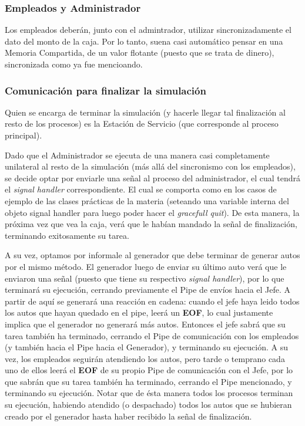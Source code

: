 \documentclass[a4paper,12pt]{article}
\begin{document}
\subsubsection{Empleados y Administrador}
Los empleados deberán, junto con el admintrador, utilizar sincronizadamente el dato del monto de la caja. Por lo tanto, suena casi automático pensar en una Memoria Compartida, de un valor flotante (puesto que se trata de dinero), sincronizada como ya fue mencioando.

\subsubsection{Comunicación para finalizar la simulación}
Quien se encarga de terminar la simulación (y hacerle llegar tal finalización al resto de los procesos) es la Estación de Servicio (que corresponde al proceso principal).

Dado que el Administrador se ejecuta de una manera casi completamente unilateral al resto de la simulación (más allá del sincronismo con los empleados), se decide optar por enviarle una señal al proceso del administrador, el cual tendrá el \textit{signal handler} correspondiente. El cual se comporta como en los casos de ejemplo de las clases prácticas de la materia (seteando una variable interna del objeto signal handler para luego poder hacer el \textit{gracefull quit}). De esta manera, la próxima vez que vea la caja, verá que le habían mandado la señal de finalización, terminando exitosamente su tarea.

A su vez, optamos por informale al generador que debe terminar de generar autos por el mismo método. El generador luego de enviar su último auto verá que le enviaron una señal (puesto que tiene su respectivo \textit{signal handler}), por lo que terminará su ejecución, cerrando previamente el Pipe de envíos hacia el Jefe. A partir de aquí se generará una reacción en cadena: cuando el jefe haya leido todos los autos que hayan quedado en el pipe, leerá un \textbf{EOF}, lo cual justamente implica que el generador no generará más autos. Entonces el jefe sabrá que su tarea también ha terminado, cerrando el Pipe de comunicación con los empleados (y también hacia el Pipe hacia el Generador), y terminando su ejecución. A su vez, los empleados seguirán atendiendo los autos, pero tarde o temprano cada uno de ellos leerá el \textbf{EOF} de su propio Pipe de comunicación con el Jefe, por lo que sabrán que su tarea también ha terminado, cerrando el Pipe mencionado, y terminando su ejecución. Notar que de ésta manera todos los procesos terminan su ejecución, habiendo atendido (o despachado) todos los autos que se hubieran creado por el generador hasta haber recibido la señal de finalización.
\end{document}
